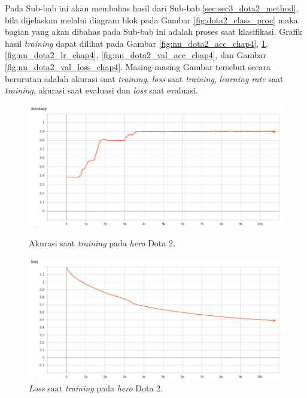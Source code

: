 Pada Sub-bab ini akan membahas hasil dari Sub-bab \ref{sec:sec3_dota2_method}, bila dijelaskan melalui diagram blok pada Gambar \ref{fig:dota2_class_proc} maka bagian yang akan dibahas pada Sub-bab ini adalah proses saat klasifikasi. Grafik hasil \textit{training} dapat dilihat pada Gambar \ref{fig:nn_dota2_acc_chap4}, \ref{fig:nn_dota2_loss_chap4}, \ref{fig:nn_dota2_lr_chap4}, \ref{fig:nn_dota2_val_acc_chap4}, dan Gambar \ref{fig:nn_dota2_val_loss_chap4}. Masing-masing Gambar tersebut secara berurutan adalah akurasi saat \textit{training}, \textit{loss} saat \textit{training}, \textit{learning rate} saat \textit{training}, akurasi saat evaluasi dan \textit{loss} saat evaluasi. 
\vspace{2ex}

\begin{figure} [!h] \centering
	\includegraphics[scale=0.44]{img/callback_acc_chap4.png}
	\caption{Akurasi saat \textit{training} pada \textit{hero} Dota 2.}
	\label{fig:nn_dota2_acc_chap4}
	\vspace{4ex}

	\includegraphics[scale=0.44]{img/callback_loss_chap4.png}
	\caption{\textit{Loss} saat \textit{training} pada \textit{hero} Dota 2.}
	\label{fig:nn_dota2_loss_chap4}
\end{figure}
\clearpage

